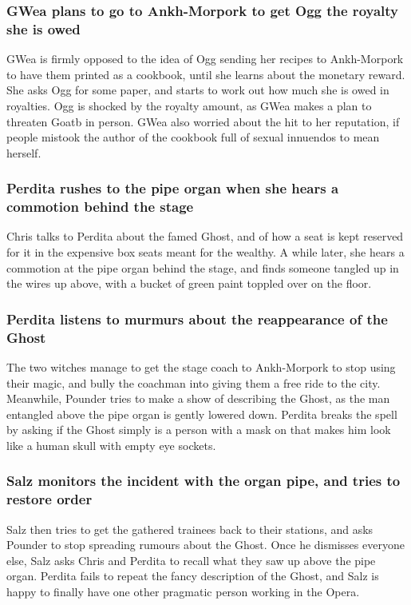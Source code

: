 \subsubsection{\Gls{GWea} plans to go to Ankh-Morpork to get \Gls{Ogg} the royalty she is owed}
\Gls{GWea} is firmly opposed to the idea of \Gls{Ogg} sending her recipes to Ankh-Morpork to have
them printed as a cookbook, until she learns about the monetary reward. She asks \Gls{Ogg} for some
paper, and starts to work out how much she is owed in royalties. \Gls{Ogg} is shocked by the royalty
amount, as \Gls{GWea} makes a plan to threaten \Gls{Goatb} in person. \Gls{GWea} also worried about
the hit to her reputation, if people mistook the author of the cookbook full of sexual innuendos to
mean herself.

\subsubsection{\Gls{Perdita} rushes to the pipe organ when she hears a commotion behind the stage}
\Gls{Chris} talks to \Gls{Perdita} about the famed \Gls{Ghost}, and of how a seat is kept reserved
for it in the expensive box seats meant for the wealthy. A while later, she hears a commotion at the
pipe organ behind the stage, and finds someone tangled up in the wires up above, with a bucket of
green paint toppled over on the floor.

\subsubsection{\Gls{Perdita} listens to murmurs about the reappearance of the \Gls{Ghost}}
The two witches manage to get the stage coach to Ankh-Morpork to stop using their magic, and bully
the coachman into giving them a free ride to the city. Meanwhile, \Gls{Pounder} tries to make a
show of describing the \Gls{Ghost}, as the man entangled above the pipe organ is gently lowered
down. \Gls{Perdita} breaks the spell by asking if the \Gls{Ghost} simply is a person with a mask
on that makes him look like a human skull with empty eye sockets.

\subsubsection{\Gls{Salz} monitors the incident with the organ pipe, and tries to restore order}
\Gls{Salz} then tries to get the gathered trainees back to their stations, and asks \Gls{Pounder}
to stop spreading rumours about the \Gls{Ghost}. Once he dismisses everyone else, \Gls{Salz} asks
\Gls{Chris} and \Gls{Perdita} to recall what they saw up above the pipe organ. \Gls{Perdita} fails
to repeat the fancy description of the \Gls{Ghost}, and \Gls{Salz} is happy to finally have one
other pragmatic person working in the Opera.

